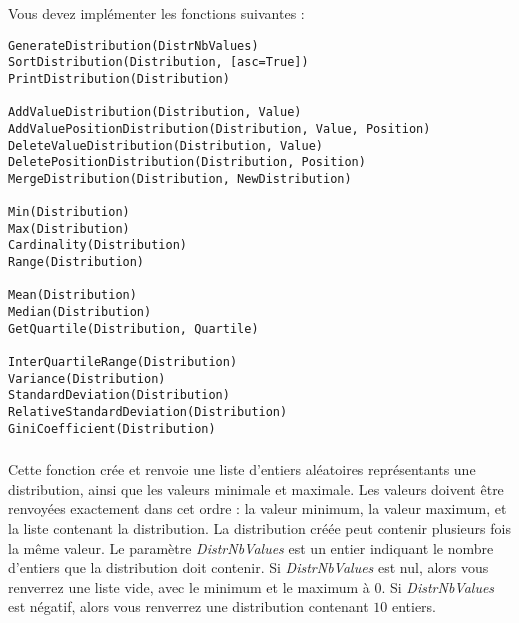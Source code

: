\newpage

\noindent Vous devez implémenter les fonctions suivantes :

\bigskip

\lstset{language=python}
\begin{lstlisting}[frame=single,title={Liste des fonctions pour le module de statistiques}]
GenerateDistribution(DistrNbValues)
SortDistribution(Distribution, [asc=True])
PrintDistribution(Distribution)

AddValueDistribution(Distribution, Value)
AddValuePositionDistribution(Distribution, Value, Position)
DeleteValueDistribution(Distribution, Value)
DeletePositionDistribution(Distribution, Position)
MergeDistribution(Distribution, NewDistribution)

Min(Distribution)
Max(Distribution)
Cardinality(Distribution)
Range(Distribution)

Mean(Distribution)
Median(Distribution)
GetQuartile(Distribution, Quartile)

InterQuartileRange(Distribution)
Variance(Distribution)
StandardDeviation(Distribution)
RelativeStandardDeviation(Distribution)
GiniCoefficient(Distribution)
\end{lstlisting}


\bigskip


\subsubsection*{}

\noindent Cette fonction crée et renvoie une liste d'entiers aléatoires représentants une distribution, ainsi que les valeurs minimale et maximale.
Les valeurs doivent être renvoyées exactement dans cet ordre : la valeur minimum, la valeur maximum, et la liste contenant la distribution.
La distribution créée peut contenir plusieurs fois la même valeur.
Le paramètre \textit{DistrNbValues} est un entier indiquant le nombre d'entiers que la distribution doit contenir.
Si \textit{DistrNbValues} est nul, alors vous renverrez une liste vide, avec le minimum et le maximum à $ 0 $.
Si \textit{DistrNbValues} est négatif, alors vous renverrez une distribution contenant $ 10 $ entiers.


\subsubsection*{}

